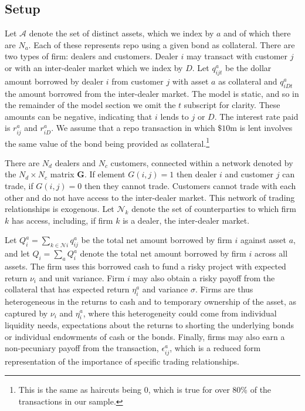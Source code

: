 \subsection{Setup}

Let $\mathcal{A}$ denote the set of distinct assets, which we index by $a$ and of which there are $N_a$. Each of these represents repo using a given bond as collateral. There are two types of firm: dealers and customers. Dealer $i$ may transact with customer $j$ or with an inter-dealer market which we index by $D$. Let $q^a_{ijt}$ be the dollar amount borrowed by dealer $i$ from customer $j$ with asset $a$ as collateral and $q^a_{iDt}$ the amount borrowed from the inter-dealer market. The model is static, and so in the remainder of the model section we omit the $t$ subscript for clarity. These amounts can be negative, indicating that $i$ lends to $j$ or $D$. The interest rate paid is $r^a_{ij}$ and $r^a_{iD}$. We assume that a repo transaction in which $\$10$m is lent involves the same value of the bond being provided as collateral.\footnote{This is the same as haircuts being 0, which is true for over 80\% of the transactions in our sample.}

There are $N_d$ dealers and $N_c$ customers, connected within a network denoted by the $N_d \times N_c$ matrix $\mathbf{G}$. If element $G(i,j)=1$ then dealer $i$ and customer $j$ can trade, if $G(i,j)=0$ then they cannot trade. Customers cannot trade with each other and do not have access to the inter-dealer market. This network of trading relationships is exogenous. Let $\mathcal{N}_k$ denote the set of counterparties to which firm $k$ has access, including, if firm $k$ is a dealer, the inter-dealer market. 

Let $Q^a_{i}=\sum_{k \in \mathcal{N}i} q^a_{ij}$ be the total net amount borrowed by firm $i$ against asset $a$, and let $Q_{i}=\sum_a Q^a_{i}$ denote the total net amount borrowed by firm $i$ across all assets. The firm uses this borrowed cash to fund a risky project with expected return $\nu_{i}$ and unit variance. Firm $i$ may also obtain a risky payoff from the collateral that has expected return $\eta^a_i$ and variance $\sigma$. Firms are thus heterogeneous in the returns to cash and to temporary ownership of the asset, as captured by $\nu_i$ and $\eta^a_{i}$, where this heterogeneity could come from individual liquidity needs, expectations about the returns to shorting the underlying bonds or individual endowments of cash or the bonds. Finally, firms may also earn a non-pecuniary payoff from the transaction, $\epsilon^a_{ij}$, which is a reduced form representation of the importance of specific trading relationships.

